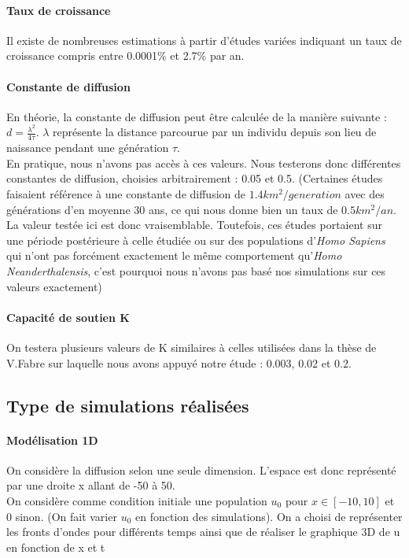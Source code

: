 \documentclass[a4paper,11pt]{article}
\begin{document}
\paragraph{Taux de croissance} Il existe de nombreuses estimations à partir d'études variées indiquant un taux de croissance compris entre 0.0001\% et 2.7\% par an.
\paragraph{Constante de diffusion} En théorie, la constante de diffusion peut être calculée de la manière suivante : $d= \frac{\lambda ^2}{4\tau}$. $\lambda $ représente la distance parcourue par un individu depuis son lieu de naissance pendant une génération $\tau$.\\ 
En pratique, nous n'avons pas accès à ces valeurs. Nous testerons donc différentes constantes de diffusion, choisies arbitrairement : 0.05 et 0.5. (Certaines études faisaient référence à une constante de diffusion de $1.4km^2/generation$ avec des générations d'en moyenne 30 ans, ce qui nous donne bien un taux de $0.5 km^2/an$. La valeur testée ici est donc vraisemblable. Toutefois, ces études portaient sur une période postérieure à celle étudiée ou sur des populations d'\textit{Homo Sapiens} qui n'ont pas forcément exactement le même comportement qu'\textit{Homo Neanderthalensis}, c'est pourquoi nous n'avons pas basé nos simulations sur ces valeurs exactement)
\paragraph{Capacité de soutien K} On testera plusieurs valeurs de K similaires à celles utilisées dans la thèse de V.Fabre sur laquelle nous avons appuyé notre étude : 0.003, 0.02 et 0.2. %
\subsection{Type de simulations réalisées}
\paragraph{Modélisation 1D}
On considère la diffusion selon une seule dimension. L'espace est donc représenté par une droite x allant de -50 à 50.\\
On considère comme condition initiale une population $u_0$ pour $x\in[-10,10]$ et 0 sinon. (On fait varier $u_0$ en fonction des simulations).
On a choisi  de représenter les fronts d'ondes pour différents temps ainsi que de réaliser le graphique 3D de u en fonction de x et t
\end{document}

